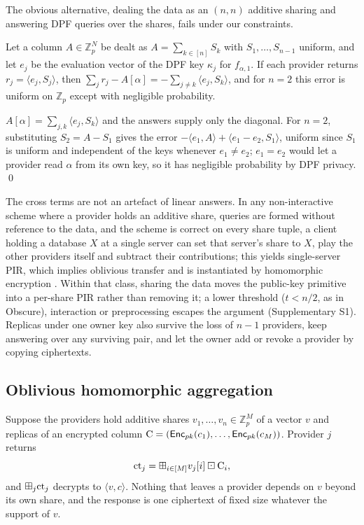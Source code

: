 The obvious alternative, dealing the data as an $(n,n)$ additive sharing and
answering DPF queries over the shares, fails under our constraints.

\begin{proposition}
\label{prop:nolocal}
Let a column $A\in\mathbb{Z}_p^N$ be dealt as $A=\sum_{k\in[n]}S_k$ with
$S_1,\dots,S_{n-1}$ uniform, and let $e_j$ be the evaluation vector of the DPF
key $\kappa_j$ for $f_{\alpha,1}$. If each provider returns
$r_j=\langle e_j,S_j\rangle$, then
$\sum_j r_j-A[\alpha]=-\sum_{j\neq k}\langle e_j,S_k\rangle$, and for $n=2$ this
error is uniform on $\mathbb{Z}_p$ except with negligible probability.
\end{proposition}
\begin{pf}
$A[\alpha]=\sum_{j,k}\langle e_j,S_k\rangle$ and the answers supply only the
diagonal. For $n=2$, substituting $S_2=A-S_1$ gives the error
$-\langle e_1,A\rangle+\langle e_1-e_2,S_1\rangle$, uniform since $S_1$ is
uniform and independent of the keys whenever $e_1\neq e_2$; $e_1=e_2$ would let
a provider read $\alpha$ from its own key, so it has negligible probability by
DPF privacy. \qed
\end{pf}

The cross terms are not an artefact of linear answers. In any non-interactive
scheme where a provider holds an additive share, queries are formed without
reference to the data, and the scheme is correct on every share tuple, a client
holding a database $X$ at a single server can set that server's share to $X$,
play the other providers itself and subtract their contributions; this yields
single-server PIR, which implies oblivious transfer
\citep{dicrescenzo2000single} and is instantiated by homomorphic encryption
\citep{kushilevitz1997replication}. Within that class, sharing the data moves
the public-key primitive into a per-share PIR rather than removing it; a lower
threshold ($t<n/2$, as in Obscure), interaction or preprocessing escapes the
argument (Supplementary S1). Replicas under one owner key also survive the
loss of $n-1$ providers, keep answering over any surviving pair, and let the
owner add or revoke a provider by copying ciphertexts.

\subsection{Oblivious homomorphic aggregation}
\label{sec:oha}
Suppose the providers hold additive shares $v_1,\dots,v_n\in\mathbb{Z}_p^M$ of
a vector $v$ and replicas of an encrypted column
$\mathrm{C}=(\mathsf{Enc}_{pk}(c_1),\dots,\mathsf{Enc}_{pk}(c_M))$. Provider $j$ returns
\begin{equation}
\label{eq:contract}
\text{ct}_j=\boxplus_{i\in[M]} v_j[i]\boxdot\mathrm{C}_i ,
\end{equation}
and $\boxplus_j\text{ct}_j$ decrypts to $\langle v,c\rangle$. Nothing that leaves
a provider depends on $v$ beyond its own share, and the response is one
ciphertext of fixed size whatever the support of $v$.

